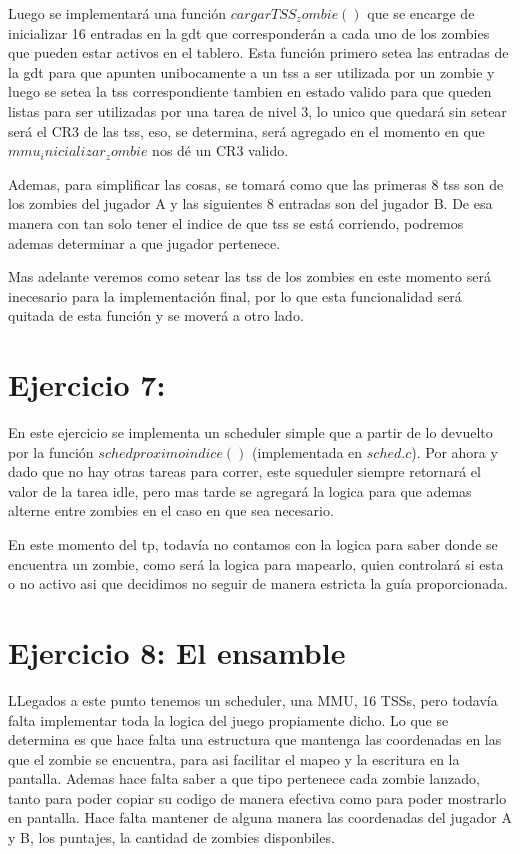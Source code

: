 \documentclass[a4paper]{article}
\begin{document}
Luego se implementará una función $cargarTSS_zombie()$ que se encarge de inicializar 16 entradas en la gdt que corresponderán a cada uno de los zombies que pueden estar activos en el tablero. Esta función primero setea las entradas de la gdt para que apunten unibocamente a un tss a ser utilizada por un zombie y luego se setea la tss correspondiente tambien en estado valido para que queden listas para ser utilizadas por una tarea de nivel 3, lo unico que quedará sin setear será el CR3 de las tss, eso, se determina, será agregado en el momento en que $mmu_inicializar_zombie$ nos dé un CR3 valido.

Ademas, para simplificar las cosas, se tomará como que las primeras 8 tss son de los zombies del jugador A y las siguientes 8 entradas son del jugador B. De esa manera con tan solo tener el indice de que tss se está corriendo, podremos ademas determinar a que jugador pertenece.

Mas adelante veremos como setear las tss de los zombies en este momento será inecesario para la implementación final, por lo que esta funcionalidad será quitada de esta función y se moverá a otro lado.

\clearpage

\section{Ejercicio 7:}

En este ejercicio se implementa un scheduler simple que a partir de lo devuelto por la función $sched proximo indice()$ (implementada en $sched.c$). Por ahora y dado que no hay otras tareas para correr, este squeduler siempre retornará el valor de la tarea idle, pero mas tarde se agregará la logica para que ademas alterne entre zombies en el caso en que sea necesario.

En este momento del tp, todavía no contamos con la logica para saber donde se encuentra un zombie, como será la logica para mapearlo, quien controlará si esta o no activo asi que decidimos no seguir de manera estricta la guía proporcionada.

\section{Ejercicio 8: El ensamble}

LLegados a este punto tenemos un scheduler, una MMU, 16 TSSs, pero todavía falta implementar toda la logica del juego propiamente dicho. Lo que se determina es que hace falta una estructura que mantenga las coordenadas en las que el zombie se encuentra, para asi facilitar el mapeo y la escritura en la pantalla. Ademas hace falta saber a que tipo pertenece cada zombie lanzado, tanto para poder copiar su codigo de manera efectiva como para poder mostrarlo en pantalla. Hace falta mantener de alguna manera las coordenadas del jugador A y B, los puntajes, la cantidad de zombies disponbiles.
\end{document}
